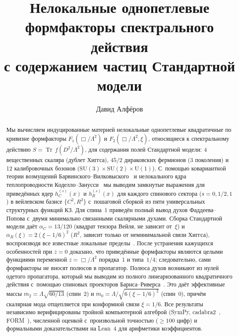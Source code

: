 \documentclass[aps,prd,twocolumn,superscriptaddress,nofootinbib,floatfix]{revtex4-2}
\theoremstyle{definition}
\theoremstyle{remark}
\newcommand{\Tr}{\operatorname{Tr}}
\begin{document}
\title{Нелокальные однопетлевые формфакторы спектрального действия\\с содержанием частиц Стандартной модели}

\author{Давид Алфёров}

\begin{abstract}
Мы вычисляем индуцированные материей нелокальные однопетлевые квадратичные
по кривизне формфакторы $F_1(\Box/\Lambda^2)$ и $F_2(\Box/\Lambda^2,\xi)$,
относящиеся к спектральному действию
$S = \Tr\,f(D^2/\Lambda^2)$, для содержания полей Стандартной модели:
4 вещественных скаляра (дублет Хиггса), $45/2$ дираковских фермионов
(3 поколения) и 12 калибровочных бозонов
($\mathrm{SU}(3)\times\mathrm{SU}(2)\times\mathrm{U}(1)$).
С~помощью ковариантной теории возмущений
Барвинского--Вилковыского~\cite{Barvinsky:1985an,Barvinsky:1987uw}
и нелокального ядра теплопроводности
Коделло--Занусси~\cite{Codello:2012kq} мы выводим замкнутые выражения
для приведённых ядер $h_C^{(s)}(x)$ и $h_R^{(s)}(x)$ для каждого спинового
сектора ($s = 0, 1/2, 1$) в вейлевском базисе $\{C^2, R^2\}$
с~пошаговой сборкой из пяти универсальных структурных функций КЗ. Для
спина~1 приведён полный вывод духов Фаддеева--Попова с~двумя минимально
связанными скалярными духами. Сборка Стандартной модели даёт
$\alpha_C = 13/120$ (квадрат тензора Вейля, не зависит от~$\xi$) и
$\alpha_R(\xi) = 2(\xi - 1/6)^2$ ($R^2$, зависит только от неминимальной
связи Хиггса), воспроизводя все известные локальные
пределы~\cite{Gilkey:1975iq,Vassilevich:2003xt,Codello:2008vh,Stelle:1976gc}.
После устранения кажущихся особенностей при $z = 0$ доказано, что приведённые
формфакторы являются целыми функциями переменной $z = \Box/\Lambda^2$ порядка~1
и типа~$1/4$; следовательно, сами формфакторы не вносят полюсов в пропагатор.
Полюса духов возникают из нулей одетого пропагатора, который мы выводим
из полного линеаризованного квадратичного действия с~помощью спиновых
проекторов Барнса--Риверса~\cite{Barnes:1965,Rivers:1964}. Это даёт эффективные
массы $m_2 = \Lambda\sqrt{60/13}$ (спин~2) и
$m_0 = \Lambda/\sqrt{6(\xi - 1/6)^2}$ (спин~0), причём скалярная мода
отщепляется при конформной связи $\xi = 1/6$.
Все результаты независимо верифицированы тройной компьютерной алгеброй
(SymPy, cadabra2~\cite{Peeters:2007wn}, FORM~\cite{Vermaseren:2000nd}),
численной оценкой с~произвольной точностью ($\geq 100$ цифр) и формальными
доказательствами на Lean~4 для арифметики коэффициентов.
\end{abstract}
\end{document}
